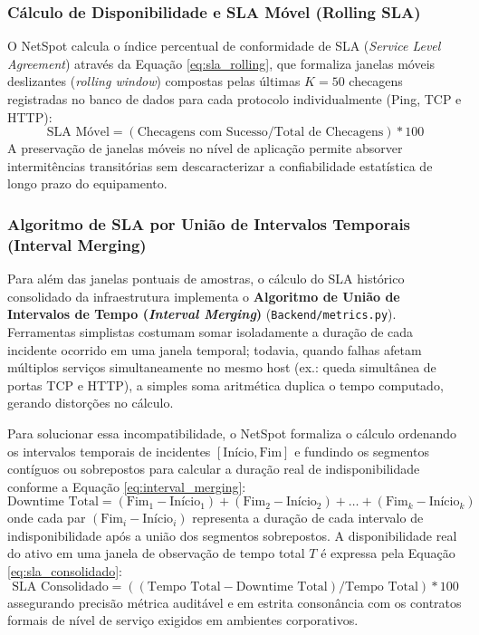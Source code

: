 \documentclass[12pt,a4paper]{article}
\begin{document}
\subsubsection{Cálculo de Disponibilidade e SLA Móvel (Rolling SLA)}
O NetSpot calcula o índice percentual de conformidade de SLA (\textit{Service Level Agreement}) através da Equação \ref{eq:sla_rolling}, que formaliza janelas móveis deslizantes (\textit{rolling window}) compostas pelas últimas $K = 50$ checagens registradas no banco de dados para cada protocolo individualmente (Ping, TCP e HTTP):
\begin{equation}
\label{eq:sla_rolling}
\text{SLA Móvel} = (\text{Checagens com Sucesso} / \text{Total de Checagens}) * 100
\end{equation}
A preservação de janelas móveis no nível de aplicação permite absorver intermitências transitórias sem descaracterizar a confiabilidade estatística de longo prazo do equipamento.

\subsubsection{Algoritmo de SLA por União de Intervalos Temporais (Interval Merging)}
Para além das janelas pontuais de amostras, o cálculo do SLA histórico consolidado da infraestrutura implementa o \textbf{Algoritmo de União de Intervalos de Tempo (\textit{Interval Merging})} (\texttt{Backend/metrics.py}). Ferramentas simplistas costumam somar isoladamente a duração de cada incidente ocorrido em uma janela temporal; todavia, quando falhas afetam múltiplos serviços simultaneamente no mesmo host (ex.: queda simultânea de portas TCP e HTTP), a simples soma aritmética duplica o tempo computado, gerando distorções no cálculo.

Para solucionar essa incompatibilidade, o NetSpot formaliza o cálculo ordenando os intervalos temporais de incidentes $[\text{Início}, \text{Fim}]$ e fundindo os segmentos contíguos ou sobrepostos para calcular a duração real de indisponibilidade conforme a Equação \ref{eq:interval_merging}:
\begin{equation}
\label{eq:interval_merging}
\text{Downtime Total} = (\text{Fim}_1 - \text{Início}_1) + (\text{Fim}_2 - \text{Início}_2) + \dots + (\text{Fim}_k - \text{Início}_k)
\end{equation}
onde cada par $(\text{Fim}_i - \text{Início}_i)$ representa a duração de cada intervalo de indisponibilidade após a união dos segmentos sobrepostos. A disponibilidade real do ativo em uma janela de observação de tempo total $T$ é expressa pela Equação \ref{eq:sla_consolidado}:
\begin{equation}
\label{eq:sla_consolidado}
\text{SLA Consolidado} = ((\text{Tempo Total} - \text{Downtime Total}) / \text{Tempo Total}) * 100
\end{equation}
assegurando precisão métrica auditável e em estrita consonância com os contratos formais de nível de serviço exigidos em ambientes corporativos.
\end{document}

